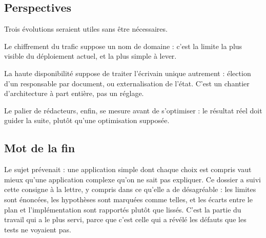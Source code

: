 \subsection{Perspectives}

Trois évolutions seraient utiles sans être nécessaires.

Le chiffrement du trafic suppose un nom de domaine : c'est la limite la plus
visible du déploiement actuel, et la plus simple à lever.

La haute disponibilité suppose de traiter l'écrivain unique autrement :
élection d'un responsable par document, ou externalisation de l'état. C'est un
chantier d'architecture à part entière, pas un réglage.

Le palier de rédacteurs, enfin, se mesure avant de s'optimiser : le résultat
réel doit guider la suite, plutôt qu'une optimisation supposée.

\subsection{Mot de la fin}

Le sujet prévenait : une application simple dont chaque choix est compris vaut
mieux qu'une application complexe qu'on ne sait pas expliquer. Ce dossier a
suivi cette consigne à la lettre, y compris dans ce qu'elle a de désagréable :
les limites sont énoncées, les hypothèses sont marquées comme telles, et les
écarts entre le plan et l'implémentation sont rapportés plutôt que lissés. C'est
la partie du travail qui a le plus servi, parce que c'est celle qui a révélé les
défauts que les tests ne voyaient pas.
